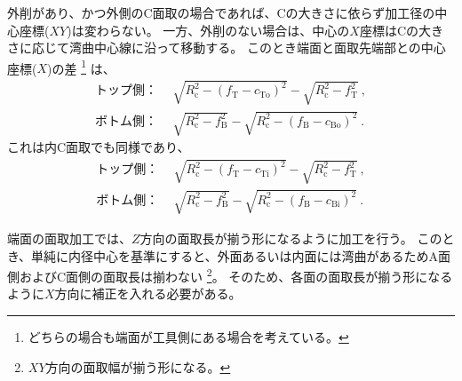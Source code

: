\clearpage
外削があり、かつ外側のC面取の場合であれば、Cの大きさに依らず加工径の中心座標($XY$)は変わらない。
一方、外削のない場合は、中心の$X$座標はCの大きさに応じて湾曲中心線に沿って移動する。
このとき端面と面取先端部との中心座標($X$)の差
\footnote{どちらの場合も端面が工具側にある場合を考えている。}
は、
\begin{align*}
  \text{トップ側：}&~~
  \sqrt{R_\mathrm c^2-\left(f_\mathrm T-c_\mathrm{To}\right)^2}-\sqrt{R_\mathrm c^2-f_\mathrm T^2}\ ,\\
  \text{ボトム側：}&~~
  \sqrt{R_\mathrm c^2-f_\mathrm B^2}-\sqrt{R_\mathrm c^2-\left(f_\mathrm B-c_\mathrm{Bo}\right)^2}\ .
\end{align*}
これは内C面取でも同様であり、
\begin{align*}
  \text{トップ側：}&~~
  \sqrt{R_\mathrm c^2-\left(f_\mathrm T-c_\mathrm{Ti}\right)^2}-\sqrt{R_\mathrm c^2-f_\mathrm T^2}\ ,\\
  \text{ボトム側：}&~~
  \sqrt{R_\mathrm c^2-f_\mathrm B^2}-\sqrt{R_\mathrm c^2-\left(f_\mathrm B-c_\mathrm{Bi}\right)^2}\ .
\end{align*}



端面の面取加工では、$Z$方向の面取長が揃う形になるように加工を行う。
このとき、単純に内径中心を基準にすると、外面あるいは内面には湾曲があるためA面側およびC面側の面取長は揃わない
\footnote{$XY$方向の面取幅が揃う形になる。}。
そのため、各面の面取長が揃う形になるように$X$方向に補正を入れる必要がある。













